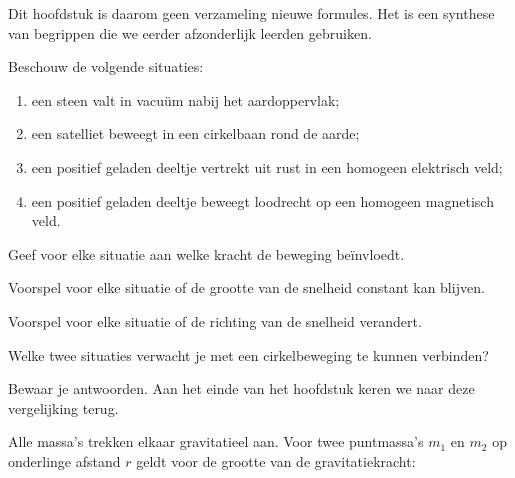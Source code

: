 \documentclass{ximera}
\begin{document}
Dit hoofdstuk is daarom geen verzameling nieuwe formules. Het is een
synthese van begrippen die we eerder afzonderlijk leerden gebruiken.


\begin{oefening}{\oefU\ESS}

Beschouw de volgende situaties:

\begin{enumerate}
  \item een steen valt in vacuüm nabij het aardoppervlak;
  \item een satelliet beweegt in een cirkelbaan rond de aarde;
  \item een positief geladen deeltje vertrekt uit rust in een homogeen
        elektrisch veld;
  \item een positief geladen deeltje beweegt loodrecht op een homogeen
        magnetisch veld.
\end{enumerate}

\begin{question}
Geef voor elke situatie aan welke kracht de beweging beïnvloedt.
\end{question}

\begin{question}
Voorspel voor elke situatie of de grootte van de snelheid constant kan
blijven.
\end{question}

\begin{question}
Voorspel voor elke situatie of de richting van de snelheid verandert.
\end{question}

\begin{question}
Welke twee situaties verwacht je met een cirkelbeweging te kunnen
verbinden?
\end{question}

Bewaar je antwoorden. Aan het einde van het hoofdstuk keren we naar deze
vergelijking terug.

\end{oefening}




Alle massa's trekken elkaar gravitatieel aan. Voor twee puntmassa's
$m_1$ en $m_2$ op onderlinge afstand $r$ geldt voor de grootte van de
gravitatiekracht:
\end{document}
